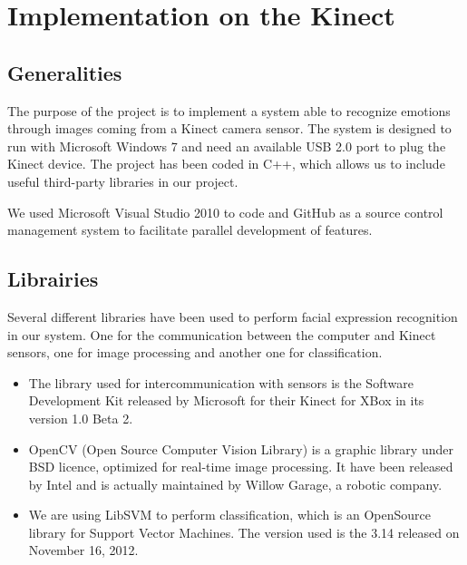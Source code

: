 \chapter{Implementation on the Kinect}
\label{chap:implementation_kinect}

\section{Generalities}

\vspace{\baselineskip}
\noindent The purpose of the project is to implement a system able to recognize emotions through images coming from a Kinect camera sensor. The system is designed to run with Microsoft Windows 7 and need an available USB 2.0 port to plug the Kinect device. The project has been coded in C++, which allows us to include useful third-party libraries in our project.
\newline 

\noindent We used Microsoft Visual Studio 2010 to code and GitHub as a source control management system to facilitate parallel development of features.
\newline

\section{Librairies}

\vspace{\baselineskip}
\noindent Several different libraries have been used to perform facial expression recognition in our system. One for the communication between the computer and Kinect sensors, one for image processing and another one for classification.

\begin{itemize}
  \item The library used for intercommunication with sensors is the Software Development Kit released by Microsoft for their Kinect for XBox in its version 1.0 Beta 2.
  \item OpenCV (Open Source Computer Vision Library) is a graphic library under BSD licence, optimized for real-time image processing. It have been released by Intel and is actually maintained by Willow Garage, a robotic company.
  \item We are using LibSVM to perform classification, which is an OpenSource library for Support Vector Machines. The version used is the 3.14 released on November 16, 2012.
\end{itemize}

